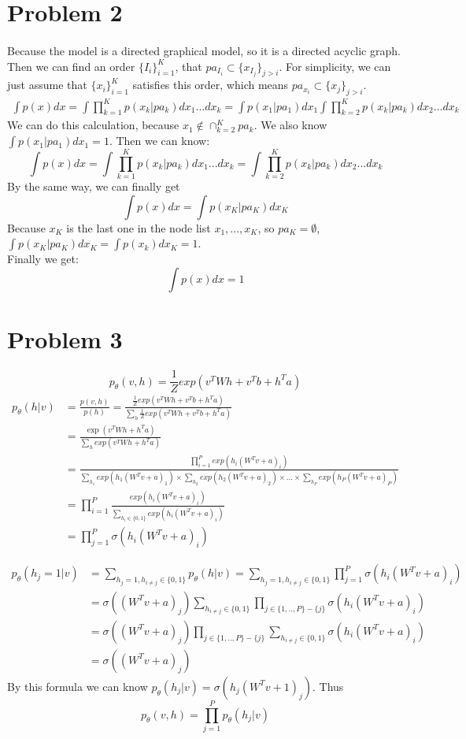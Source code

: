 \documentclass[twoside]{article}
\begin{document}
\section{Problem 2}
\paragraph{} Because the model is a directed graphical model, so it is a directed acyclic graph. 
Then we can find an order $\{I_i\}_{i=1}^{K}$, that $pa_{I_i}\subset \{x_{I_j}\}_{j>i}$. 
For simplicity, we can just assume that $\{x_i\}_{i=1}^{K}$ satisfies this order,
which means $pa_{x_i}\subset \{x_{j}\}_{j>i}$.
\begin{align*}
\int p(x) dx= \int \prod_{k=1}^K p(x_k|pa_k)dx_1...dx_k = \int p(x_1|pa_1)dx_1 \int \prod_{k=2}^K p(x_k|pa_k)dx_2...dx_k
\end{align*}
We can do this calculation, because $x_1 \not\in \cap_{k=2}^K pa_k$. We also know $\int p(x_1|pa_1)dx_1=1$. Then we can know:
$$\int p(x) dx= \int \prod_{k=1}^K p(x_k|pa_k)dx_1...dx_k=\int \prod_{k=2}^K p(x_k|pa_k)dx_2...dx_k$$
By the same way, we can finally get 
$$\int p(x) dx = \int p(x_K|pa_K) dx_K$$
Because $x_K$ is the last one in the node list $x_1,...,x_K$, so $pa_K = \emptyset$, $\int p(x_K|pa_K) dx_K = \int p(x_k)dx_K = 1$.\\
Finally we get:
$$\int p(x)dx = 1$$

\section{Problem 3}
$$p_\theta(v,h) = \frac{1}{Z}exp(v^TWh + v^Tb + h^T a)$$
\begin{align*}
p_\theta(h|v)&=\frac{p(v,h)}{p(h)} =\frac{\frac{1}{Z}exp(v^TWh + v^Tb + h^T a)}{\sum_h \frac{1}{Z}exp(v^TWh + v^Tb + h^T a) }\\
&=\frac{\exp(v^TWh + h^Ta)}{\sum_h exp(v^TWh + h^Ta) }\\
&=\frac{\prod_{i=1}^Pexp(h_i(W^Tv +a)_{i})}{\sum_{h_1} exp(h_1(W^Tv +a)_{1}) \times \sum_{h_2} exp(h_2(W^Tv +a)_{2})\times...\times\sum_{h_P} exp(h_P(W^Tv +a)_{P})}\\
&=\prod_{i=1}^P \frac{exp(h_i(W^Tv +a)_{i})}{\sum_{h_i\in\{0,1\} }exp(h_i(W^Tv +a)_{i})}\\
&=\prod_{j=1}^P \sigma (h_i(W^Tv +a)_{i})
\end{align*}

\begin{align*}
p_\theta(h_j=1|v) &= \sum_{h_j = 1, h_{i\neq j} \in \{0,1\} }p_\theta (h|v ) = \sum_{h_j = 1, h_{i\neq j} \in \{0,1\} }\prod_{j=1}^P \sigma (h_i(W^Tv +a)_{i})\\
&=\sigma((W^Tv +a)_{j})\sum_{h_{i\neq j} \in \{0,1\} }\prod_{j\in\{1,..,P\}-\{j\}}\sigma (h_i(W^Tv +a)_{i})\\
&=\sigma((W^Tv +a)_{j})\prod_{j\in\{1,..,P\}-\{j\}}\sum_{h_{i\neq j} \in \{0,1\} }\sigma (h_i(W^Tv +a)_{i})\\
&=\sigma((W^Tv +a)_{j})
\end{align*}
By this formula we can know $p_\theta(h_j|v) = \sigma(h_j(W^Tv+1)_j)$.
Thus $$p_\theta(v,h) = \prod_{j=1}^P p_\theta(h_j|v)$$
\end{document}

